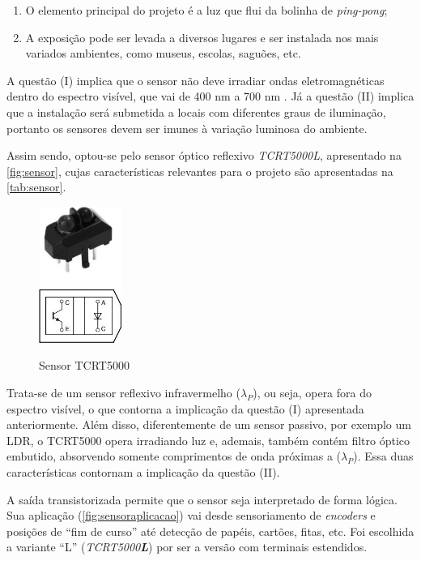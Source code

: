 \begin{enumerate}[label=\Roman*.]
    \item O elemento principal do projeto é a luz que flui da bolinha de \emph{ping-pong};
    \item A exposição pode ser levada a diversos lugares e ser instalada nos mais variados ambientes, como museus, escolas, saguões, etc.
\end{enumerate}

A questão (I) implica que o sensor não deve irradiar ondas eletromagnéticas dentro do espectro visível, que vai de {400 nm} a {700 nm} \cite{fundafisica}. Já a questão (II) implica que a instalação será submetida a locais com diferentes graus de iluminação, portanto os sensores devem ser imunes à variação luminosa do ambiente.

Assim sendo, optou-se pelo sensor óptico reflexivo \emph{TCRT5000L}, apresentado na \autoref{fig:sensor}, cujas características relevantes para o projeto são apresentadas na \autoref{tab:sensor}.

\begin{figure}[H]
    \centering
    \caption{Sensor TCRT5000}
    \includegraphics[width=0.24\textwidth]{./dados/figuras/sensor}
    \label{fig:sensor}
\end{figure}



Trata-se de um sensor reflexivo infravermelho ($\lambda_{P}$), ou seja, opera fora do espectro visível, o que contorna a implicação da questão (I) apresentada anteriormente. Além disso, diferentemente de um sensor passivo, por exemplo um LDR, o TCRT5000 opera irradiando luz e, ademais, também contém filtro óptico embutido, absorvendo somente comprimentos de onda próximas a ($\lambda_{P}$). Essa duas características contornam a implicação da questão (II).

A saída transistorizada permite que o sensor seja interpretado de forma lógica. Sua aplicação (\autoref{fig:sensoraplicacao}) vai desde sensoriamento de \emph{encoders} e posições de ``fim de curso'' até detecção de papéis, cartões, fitas, etc. Foi escolhida a variante ``L'' (\emph{TCRT5000\textbf{L}}) por ser a versão com terminais estendidos.

